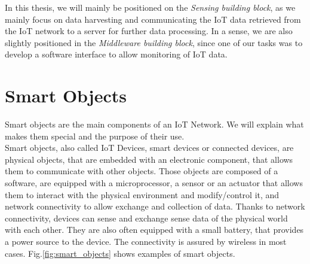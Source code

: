 In this thesis, we will mainly be positioned on the \textit{Sensing building block}, as we mainly focus on data harvesting and communicating the IoT data retrieved from the IoT network to a server for further data processing. In a sense, we are also slightly positioned in the \textit{Middleware building block}, since one of our tasks was to develop a software interface to allow monitoring of IoT data.

\section{Smart Objects}

Smart objects are the main components of an IoT Network. We will explain what makes them special and the purpose of their use.\\

Smart objects, also called IoT Devices, smart devices or connected devices, are physical objects, that are embedded with an electronic component, that allows them to communicate with other objects. Those objects are composed of a software, are equipped with a microprocessor, a sensor or an actuator that allows them to interact with the physical environment and modify/control it, and network connectivity to allow exchange and collection of data. Thanks to network connectivity, devices can sense and exchange sense data of the physical world with each other. They are also often equipped with a small battery, that provides a power source to the device. The connectivity is assured by wireless in most cases. Fig.\ref{fig:smart_objects} shows examples of smart objects.\\

